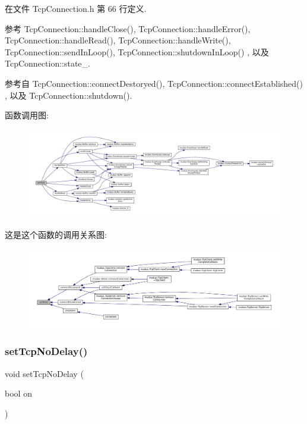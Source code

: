 在文件 Tcp\+Connection.\+h 第 66 行定义.



参考 Tcp\+Connection\+::handle\+Close(), Tcp\+Connection\+::handle\+Error(), Tcp\+Connection\+::handle\+Read(), Tcp\+Connection\+::handle\+Write(), Tcp\+Connection\+::send\+In\+Loop(), Tcp\+Connection\+::shutdown\+In\+Loop() , 以及 Tcp\+Connection\+::state\+\_\+.



参考自 Tcp\+Connection\+::connect\+Destoryed(), Tcp\+Connection\+::connect\+Established() , 以及 Tcp\+Connection\+::shutdown().

函数调用图\+:
\nopagebreak
\begin{figure}[H]
\begin{center}
\leavevmode
\includegraphics[width=350pt]{classmuduo_1_1TcpConnection_a5cefef7ea6272b740592d9dfecbd6c20_cgraph}
\end{center}
\end{figure}
这是这个函数的调用关系图\+:
\nopagebreak
\begin{figure}[H]
\begin{center}
\leavevmode
\includegraphics[width=350pt]{classmuduo_1_1TcpConnection_a5cefef7ea6272b740592d9dfecbd6c20_icgraph}
\end{center}
\end{figure}
\mbox{\label{classmuduo_1_1TcpConnection_a7419d5072b837a2ba3cc5aac85015212}} 
\subsubsection{\texorpdfstring{set\+Tcp\+No\+Delay()}{setTcpNoDelay()}}
{\footnotesize\ttfamily void set\+Tcp\+No\+Delay (\begin{DoxyParamCaption}\item[{bool}]{on }\end{DoxyParamCaption})}



